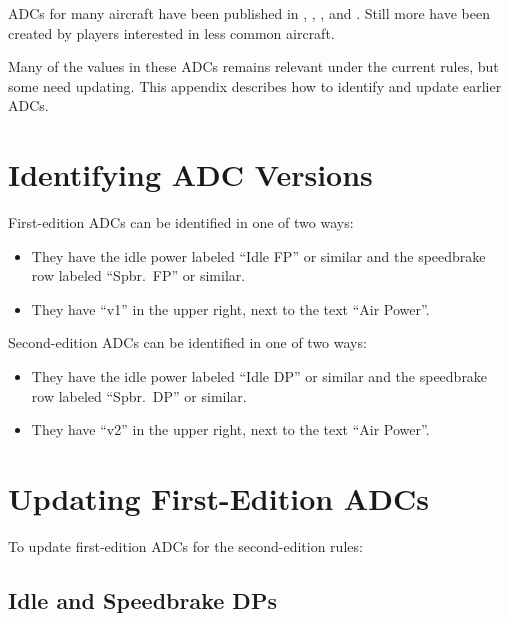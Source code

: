 
ADCs for many aircraft have been published in {\AirSup}, {\AirStr}, {\TSOH}, and {\APJ}. Still more have been created by players interested in less common aircraft. 

Many of the values in these ADCs remains relevant under the current rules, but some need updating. This appendix describes how to identify and update earlier ADCs.


\section{Identifying ADC Versions}

First-edition ADCs can be identified in one of two ways:
\begin{itemize} 
\item They have the idle power labeled “Idle FP” or similar and the speedbrake row labeled “Spbr.\ FP” or similar. 
\item They have “v1” in the upper right, next to the text “Air Power”.
\end{itemize}

Second-edition ADCs can be identified in one of two ways:
\begin{itemize} 
\item They have the idle power labeled “Idle DP” or similar and the speedbrake row labeled “Spbr.\ DP” or similar. 
\item They have “v2” in the upper right, next to the text “Air Power”.
\end{itemize}

\section{Updating First-Edition ADCs}

To update first-edition ADCs for the second-edition rules:

\subsection{Idle and Speedbrake DPs}


\begin{itemize}


\end{itemize}
